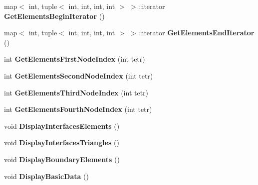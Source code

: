 \begin{DoxyCompactItemize}
\item 
map$<$ int, tuple$<$ int, int, int, int $>$ $>$\+::iterator {\bfseries Get\+Elements\+Begin\+Iterator} ()\hypertarget{class_maillage3_d_ac2efb256ab107604d7b38b274079e6cf}{}\label{class_maillage3_d_ac2efb256ab107604d7b38b274079e6cf}

\item 
map$<$ int, tuple$<$ int, int, int, int $>$ $>$\+::iterator {\bfseries Get\+Elements\+End\+Iterator} ()\hypertarget{class_maillage3_d_a9fd0670340a755340e0fd98f3974e327}{}\label{class_maillage3_d_a9fd0670340a755340e0fd98f3974e327}

\item 
int {\bfseries Get\+Elements\+First\+Node\+Index} (int tetr)\hypertarget{class_maillage3_d_a38e38c0780b249912ce4306af86475fc}{}\label{class_maillage3_d_a38e38c0780b249912ce4306af86475fc}

\item 
int {\bfseries Get\+Elements\+Second\+Node\+Index} (int tetr)\hypertarget{class_maillage3_d_ae4471b28638125300989caf8ba541391}{}\label{class_maillage3_d_ae4471b28638125300989caf8ba541391}

\item 
int {\bfseries Get\+Elements\+Third\+Node\+Index} (int tetr)\hypertarget{class_maillage3_d_ab848af39c137fc2c19c51f15066488ea}{}\label{class_maillage3_d_ab848af39c137fc2c19c51f15066488ea}

\item 
int {\bfseries Get\+Elements\+Fourth\+Node\+Index} (int tetr)\hypertarget{class_maillage3_d_a638a2fc7195de3bda56446146f4277d4}{}\label{class_maillage3_d_a638a2fc7195de3bda56446146f4277d4}

\item 
void {\bfseries Display\+Interfaces\+Elements} ()\hypertarget{class_maillage3_d_a909cf720c7d174a415b972cf528dac7f}{}\label{class_maillage3_d_a909cf720c7d174a415b972cf528dac7f}

\item 
void {\bfseries Display\+Interfaces\+Triangles} ()\hypertarget{class_maillage3_d_afc15ae92a1b7bd5193379b0d8897ac82}{}\label{class_maillage3_d_afc15ae92a1b7bd5193379b0d8897ac82}

\item 
void {\bfseries Display\+Boundary\+Elements} ()\hypertarget{class_maillage3_d_ad06d861b9da1be8b3b25fe291e507c49}{}\label{class_maillage3_d_ad06d861b9da1be8b3b25fe291e507c49}

\item 
void {\bfseries Display\+Basic\+Data} ()\hypertarget{class_maillage3_d_ac75a9dc094220de48de7019c7c26ed2e}{}\label{class_maillage3_d_ac75a9dc094220de48de7019c7c26ed2e}


\end{DoxyCompactItemize}
